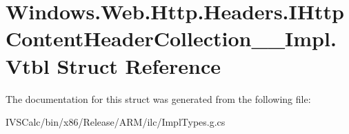 \hypertarget{struct_windows_1_1_web_1_1_http_1_1_headers_1_1_i_http_content_header_collection_____impl_1_1_vtbl}{}\section{Windows.\+Web.\+Http.\+Headers.\+I\+Http\+Content\+Header\+Collection\+\_\+\+\_\+\+Impl.\+Vtbl Struct Reference}
\label{struct_windows_1_1_web_1_1_http_1_1_headers_1_1_i_http_content_header_collection_____impl_1_1_vtbl}


The documentation for this struct was generated from the following file\+:\begin{DoxyCompactItemize}
\item 
I\+V\+S\+Calc/bin/x86/\+Release/\+A\+R\+M/ilc/Impl\+Types.\+g.\+cs\end{DoxyCompactItemize}
